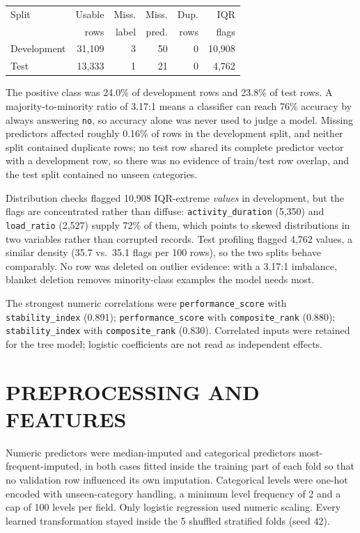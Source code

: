 \documentclass[10pt,a4paper,twocolumn]{article}
\begin{document}
\noindent
\begin{minipage}{\columnwidth}
\centering
{}
\label{tab:profile}
{\normalsize
\begin{tabularx}{\columnwidth}{@{}MDDDDD@{}}
\toprule
{}
Split & Usable & Miss. & Miss. & Dup. & IQR \\
 & rows & label & pred. & rows & flags \\
\midrule
Development & 31,109 & 3 & 50 & 0 & 10,908 \\
Test & 13,333 & 1 & 21 & 0 & 4,762 \\
\bottomrule
\end{tabularx}}
\end{minipage}
\par\vspace{5pt}

The positive class was 24.0\% of development rows and
23.8\% of test rows. A majority-to-minority ratio of
3.17:1 means a classifier can reach 76\% accuracy by
always answering \texttt{no}, so accuracy alone was never used to judge a
model. Missing predictors affected roughly 0.16\% of rows in the
development split, and neither split contained duplicate rows; no test row shared its complete predictor vector with a development row, so there was
no evidence of train/test row overlap, and the test split contained no unseen categories.

Distribution checks flagged 10,908 IQR-extreme
\emph{values} in development, but the flags are concentrated rather than diffuse:
\texttt{activity\_duration} (5,350) and \texttt{load\_ratio} (2,527) supply 72\% of them, which points to skewed distributions in two
variables rather than corrupted records. Test profiling flagged
4,762 values, a similar density (35.7 vs.\
35.1 flags per 100 rows), so the two splits behave comparably. No row was
deleted on outlier evidence: with a 3.17:1 imbalance, blanket deletion removes
minority-class examples the model needs most.

The strongest numeric correlations were \texttt{performance\_score} with \texttt{stability\_index} (0.891); \texttt{performance\_score} with \texttt{composite\_rank} (0.880); \texttt{stability\_index} with \texttt{composite\_rank} (0.830). Correlated inputs were retained for the tree model; logistic coefficients are not read as independent effects.

\section*{PREPROCESSING AND FEATURES}
Numeric predictors were median-imputed and categorical predictors
most-frequent-imputed, in both cases fitted inside the training part of each
fold so that no validation row influenced its own imputation. Categorical
levels were one-hot encoded with unseen-category handling, a minimum level
frequency of 2 and a cap of
100 levels per field. Only logistic regression used
numeric scaling. Every learned transformation stayed inside the
5 shuffled stratified folds (seed 42).
\end{document}

